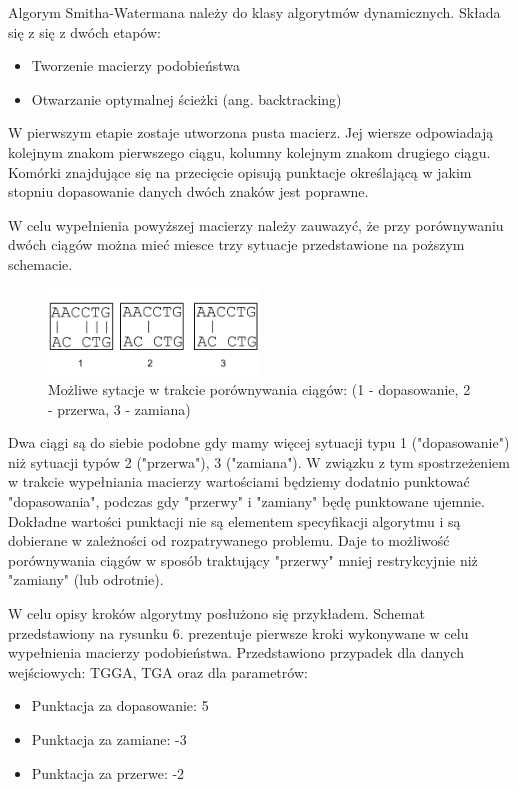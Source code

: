 \documentclass[a4paper,12pt]{article}
\newenvironment{lista}{
\begin{itemize}
  \setlength{\itemsep}{1pt}
  \setlength{\parskip}{0pt}
  \setlength{\parsep}{0pt}
}{\end{itemize}}
\begin{document}
Algorym Smitha-Watermana należy do klasy algorytmów dynamicznych. Składa się z się z dwóch etapów:
\begin{lista}
 \item Tworzenie macierzy podobieństwa
\item Otwarzanie optymalnej ścieżki (ang. backtracking)
\end{lista}

W pierwszym etapie zostaje utworzona pusta macierz. Jej wiersze odpowiadają kolejnym znakom pierwszego ciągu, kolumny kolejnym znakom drugiego ciągu. Komórki znajdujące się na przecięcie opisują punktacje określającą w jakim stopniu dopasowanie danych dwóch znaków jest poprawne. 

W celu wypełnienia powyższej macierzy należy zauwazyć, że przy porównywaniu dwóch ciągów można mieć miesce trzy sytuacje przedstawione na poższym schemacie.

\begin{figure}[H]
  \vspace{5pt}
  \centering
  \begin{center}
  \includegraphics[width=0.5\textwidth]{images/TypySytuacjiPrzyDopasowaniu.png}
  \end{center}
  \caption{Możliwe sytacje w trakcie porównywania ciągów: (1 - dopasowanie, 2 - przerwa, 3 - zamiana)}
 \end{figure}


Dwa ciągi są do siebie podobne gdy mamy więcej sytuacji typu 1 ("dopasowanie") niż sytuacji typów 2 ("przerwa"), 3 ("zamiana"). W związku z tym spostrzeżeniem w trakcie wypełniania macierzy wartościami będziemy dodatnio punktować "dopasowania", podczas gdy "przerwy" i "zamiany" będę punktowane ujemnie. Dokładne wartości punktacji nie są elementem specyfikacji algorytmu i są dobierane w zależności od rozpatrywanego problemu. Daje to możliwość porównywania ciągów w sposób traktujący "przerwy" mniej restrykcyjnie niż "zamiany" (lub odrotnie). 

W celu opisy kroków algorytmy posłużono się przykładem. Schemat przedstawiony na rysunku 6. prezentuje pierwsze kroki wykonywane w celu wypełnienia macierzy podobieństwa. Przedstawiono przypadek dla danych wejściowych: TGGA, TGA oraz dla parametrów:
\begin{lista}
\item Punktacja za dopasowanie: 5
\item Punktacja za zamiane: -3
\item Punktacja za przerwe: -2
\end{lista}
\end{document}
